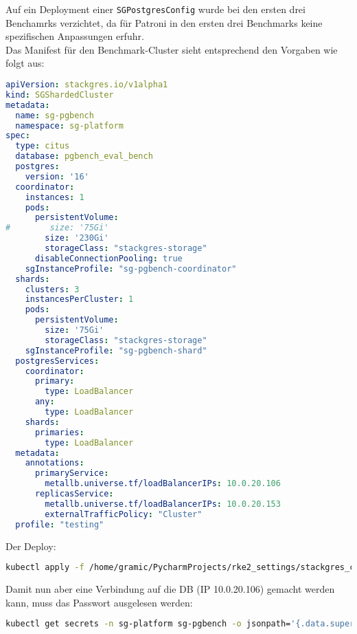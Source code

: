 Auf ein Deployment einer \texttt{SGPostgresConfig} wurde bei den ersten drei Benchamrks verzichtet, da für Patroni in den ersten drei Benchmarks keine spezifischen Anpassungen erfuhr.\\
Das Manifest für den Benchmark-Cluster sieht entsprechend den Vorgaben wie folgt aus:
\lstset{style=gra_codestyle}
\begin{lstlisting}[language=yaml, caption=StackGres-Citus - Benchmarking - SGShardedCluster,captionpos=b,label={lst:SGShardedCluster_pgbench.yaml},breaklines=true]
apiVersion: stackgres.io/v1alpha1
kind: SGShardedCluster
metadata:
  name: sg-pgbench
  namespace: sg-platform
spec:
  type: citus
  database: pgbench_eval_bench
  postgres:
    version: '16'
  coordinator:
    instances: 1
    pods:
      persistentVolume:
#        size: '75Gi'
        size: '230Gi'
        storageClass: "stackgres-storage"
      disableConnectionPooling: true
    sgInstanceProfile: "sg-pgbench-coordinator"
  shards:
    clusters: 3
    instancesPerCluster: 1
    pods:
      persistentVolume:
        size: '75Gi'
        storageClass: "stackgres-storage"
    sgInstanceProfile: "sg-pgbench-shard"
  postgresServices:
    coordinator:
      primary:
        type: LoadBalancer
      any:
        type: LoadBalancer
    shards:
      primaries:
        type: LoadBalancer
  metadata:
    annotations:
      primaryService:
        metallb.universe.tf/loadBalancerIPs: 10.0.20.106
      replicasService:
        metallb.universe.tf/loadBalancerIPs: 10.0.20.153
        externalTrafficPolicy: "Cluster"
  profile: "testing"
\end{lstlisting}
Der Deploy:
\lstset{style=gra_codestyle}
\begin{lstlisting}[language=bash, caption=StackGres-Citus - Benchmark - Cluster Deploy,captionpos=b,label={lst:stackgres_citus-benchmnarking-deploy-cluster},breaklines=true]
kubectl apply -f /home/gramic/PycharmProjects/rke2_settings/stackgres_citus/stackgres_citus/SGShardedCluster_pgbench.yaml
\end{lstlisting}

Damit nun aber eine Verbindung auf die DB (IP 10.0.20.106) gemacht werden kann, muss das Passwort ausgelesen werden:
\lstset{style=gra_codestyle}
\begin{lstlisting}[language=bash, caption=StackGres-Citus - Benchmark DB Passwort,captionpos=b,label={lst:stackgres_citus-get-benchmark-cluster-passwd},breaklines=true]
kubectl get secrets -n sg-platform sg-pgbench -o jsonpath='{.data.superuser-password}' | base64 -d
\end{lstlisting}

